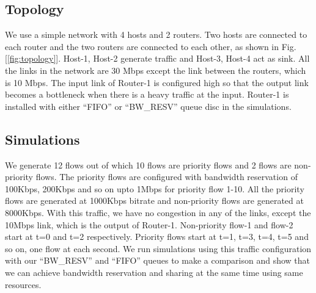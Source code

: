 \documentclass[10pt,sigconf,letterpaper,anonymous]{acmart}
\begin{document}
\subsection{Topology}
We use a simple network with 4 hosts and 2 routers. Two hosts are connected to each router and the two routers are connected to each 
other, as shown in Fig. [\ref{fig:topology}]. Host-1, Host-2 generate traffic and Host-3, Host-4 act as sink. All the links in the network are 30 Mbps except the link between the routers, which is 10 Mbps. The input link of Router-1 is configured high so that the output link becomes a bottleneck when there is a heavy traffic at the input. Router-1 is installed with either ``FIFO'' or ``BW\_RESV'' queue disc in the simulations.

\subsection{Simulations}
We generate 12 flows out of which 10 flows are priority flows and 2 flows are non-priority flows. The priority flows are configured with bandwidth reservation of 100Kbps, 200Kbps and so on upto 1Mbps for priority flow 1-10. All the priority flows are generated at 1000Kbps bitrate and non-priority flows are generated at 8000Kbps. With this traffic, we have no congestion in any of the links, except the 10Mbps link, which is the output of Router-1. Non-priority flow-1 and flow-2 start at t=0 and t=2 respectively. Priority flows start at t=1, t=3, t=4, t=5 and so on, one flow at each second. We run simulations using this traffic configuration with our ``BW\_RESV'' and ``FIFO'' queues to make a comparison and show that we can achieve bandwidth reservation and sharing at the same time using same resources.
\end{document}
